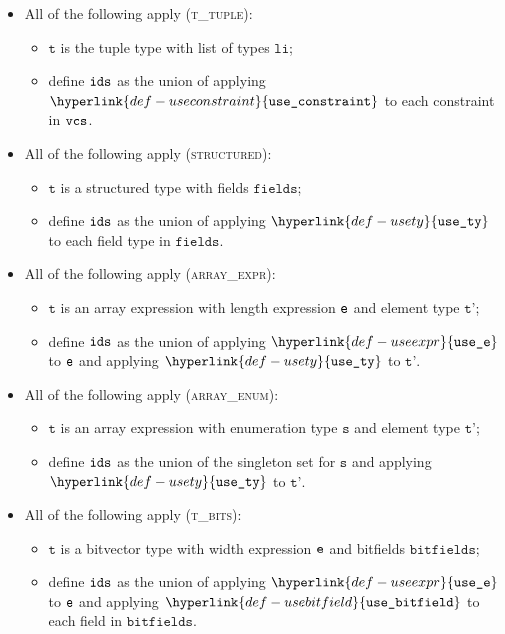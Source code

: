 \documentclass{book}
\newcommand\usety[0]{\hyperlink{def-usety}{\texttt{use\_ty}}}
\newcommand\useexpr[0]{\hyperlink{def-useexpr}{\texttt{use\_e}}}
\newcommand\usebitfield[0]{\hyperlink{def-usebitfield}{\texttt{use\_bitfield}}}
\newcommand\useconstraint[0]{\hyperlink{def-useconstraint}{\texttt{use\_constraint}}}
\newcommand\vt[0]{\texttt{t}}
\newcommand\vs[0]{\texttt{s}}
\newcommand\bitfields[0]{\texttt{bitfields}}
\newcommand\fields[0]{\texttt{fields}}
\newcommand\vtp[0]{\texttt{t'}}
\newcommand\vli[0]{\texttt{li}}
\begin{document}
\begin{itemize}
  \item All of the following apply (\textsc{t\_tuple}):
  \begin{itemize}
    \item $\vt$ is the tuple type with list of types $\vli$;
    \item define $\texttt{ids}$ as the union of applying $\useconstraint$ to each constraint in $\texttt{vcs}$.
  \end{itemize}

  \item All of the following apply (\textsc{structured}):
  \begin{itemize}
    \item $\vt$ is a structured type with fields $\fields$;
    \item define $\texttt{ids}$ as the union of applying $\usety$ to each field type in $\fields$.
  \end{itemize}

  \item All of the following apply (\textsc{array\_expr}):
  \begin{itemize}
    \item $\vt$ is an array expression with length expression $\texttt{e}$ and element type $\vtp$;
    \item define $\texttt{ids}$ as the union of applying $\useexpr$ to $\texttt{e}$ and applying $\usety$ to $\vtp$.
  \end{itemize}

  \item All of the following apply (\textsc{array\_enum}):
  \begin{itemize}
    \item $\vt$ is an array expression with enumeration type $\vs$ and element type $\vtp$;
    \item define $\texttt{ids}$ as the union of the singleton set for $\vs$ and applying $\usety$ to $\vtp$.
  \end{itemize}

  \item All of the following apply (\textsc{t\_bits}):
  \begin{itemize}
    \item $\vt$ is a bitvector type with width expression $\texttt{e}$ and bitfields $\bitfields$;
    \item define $\texttt{ids}$ as the union of applying $\useexpr$ to $\texttt{e}$ and applying $\usebitfield$ to each field in $\bitfields$.
  \end{itemize}
\end{itemize}
\end{document}
